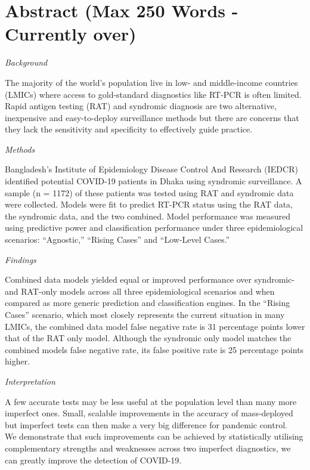 \documentclass[]{elsarticle} %
\begin{document}
\hypertarget{abstract-max-250-words---currently-over}{%
\section{Abstract (Max 250 Words - Currently over)}\label{abstract-max-250-words---currently-over}}

\emph{Background}

The majority of the world's population live in low- and middle-income countries (LMICs) where access to gold-standard diagnostics like RT-PCR is often limited.
Rapid antigen testing (RAT) and syndromic diagnosis are two alternative, inexpensive and easy-to-deploy surveillance methods but there are concerns that they lack the sensitivity and specificity to effectively guide practice.

\emph{Methods}

Bangladesh's Institute of Epidemiology Disease Control And Research (IEDCR) identified potential COVID-19 patients in Dhaka using syndromic surveillance.
A sample (n = 1172) of these patients was tested using RAT and syndromic data were collected.
Models were fit to predict RT-PCR status using the RAT data, the syndromic data, and the two combined.
Model performance was measured using predictive power and classification performance under three epidemiological scenarios: ``Agnostic,'' ``Rising Cases'' and ``Low-Level Cases.''

\emph{Findings}

Combined data models yielded equal or improved performance over syndromic- and RAT-only models across all three epidemiological scenarios and when compared as more generic prediction and classification engines.
In the ``Rising Cases'' scenario, which most closely represents the current situation in many LMICs, the combined data model false negative rate is 31 percentage points lower that of the RAT only model.
Although the syndromic only model matches the combined models false negative rate, its false positive rate is 25 percentage points higher.

\emph{Interpretation}

A few accurate tests may be less useful at the population level than many more imperfect ones.
Small, scalable improvements in the accuracy of mass-deployed but imperfect tests can then make a very big difference for pandemic control.\\
We demonstrate that such improvements can be achieved by statistically utilising complementary strengths and weaknesses across two imperfect diagnostics, we can greatly improve the detection of COVID-19.
\end{document}
